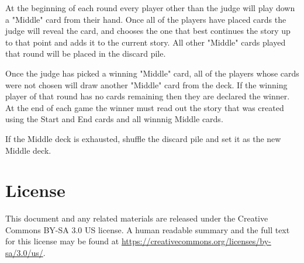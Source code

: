 \documentclass[twocolumn]{article}
\begin{document}
At the beginning of each round every player other than the judge will play down a "Middle" card from their hand. Once all of the players have placed cards the judge will reveal the card, and chooses the one that best continues the story up to that point and adds it to the current story. All other "Middle" cards played that round will be placed in the discard pile.

Once the judge has picked a winning "Middle" card, all of the players whose cards were not chosen will draw another "Middle" card from the deck. If the winning player of that round has no cards remaining then they are declared the winner. At the end of each game the winner must read out the story that was created using the Start and End cards and all winnnig Middle cards.

If the Middle deck is exhausted, shuffle the discard pile and set it as the new Middle deck.

\section*{License}

This document and any related materials are released under the Creative Commons BY-SA 3.0 US license. A human readable summary and the full text for this license may be found at \url{https://creativecommons.org/licenses/by-sa/3.0/us/}.
\end{document}
